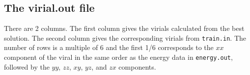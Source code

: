 \documentclass[12pt,a4paper]{report}
\begin{document}
\subsection{The virial.out file}

There are 2 columns. The first column gives the virials calculated from the best solution. The second column gives the corresponding virials from \verb"train.in". The number of rows is a multiple of 6 and the first 1/6 corresponds to the $xx$ component of the viral in the same order as the energy data in \verb"energy.out", followed by the $yy$, $zz$, $xy$, $yz$, and $zx$ components.




\end{document}
